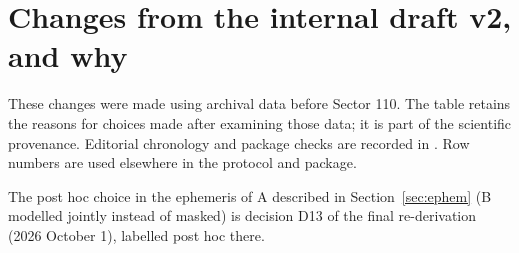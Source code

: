 \section{Changes from the internal draft v2, and why} \label{app:history}

These changes were made using archival data before Sector 110. The table retains the reasons for choices
made after examining those data; it is part of the scientific provenance. Editorial chronology and package
checks are recorded in . Row numbers are used elsewhere in the protocol and package.

The post hoc choice in the ephemeris of A described in Section~\ref{sec:ephem} (B modelled jointly instead of masked)
is decision D13 of the final re-derivation (2026 October 1), labelled post hoc there.

